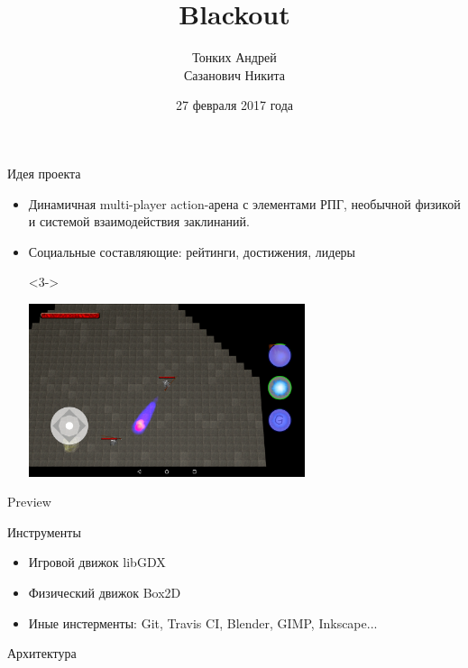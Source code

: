 \documentclass[12pt]{beamer}
\begin{document}
\title{Blackout}

\author[]{
    Тонких Андрей \\
    Сазанович Никита \\
}
\date{27 февраля 2017 года}

\frame{\titlepage}


\begin{frame}{Идея проекта}
    \begin{itemize}
        \item <1-> Динамичная multi-player action-арена с элементами РПГ, необычной физикой и системой взаимодействия заклинаний.
	      \item <2-> Социальные составляющие: рейтинги, достижения, лидеры
        \item[] <3-> \begin{center} \includegraphics[width=230pt]{screenshot.png} \end{center}
    \end{itemize}
\end{frame}

\begin{frame} {Preview}
\end{frame}


\begin{frame} {Инструменты}
    \begin{itemize}
        \item Игровой движок libGDX
        \item Физический движок Box2D
        \item Иные инстерменты: Git, Travis CI, Blender, GIMP, Inkscape...
    \end{itemize}
\end{frame}



\begin{frame} {Архитектура}
\noindent{}
\end{frame}
\end{document}
